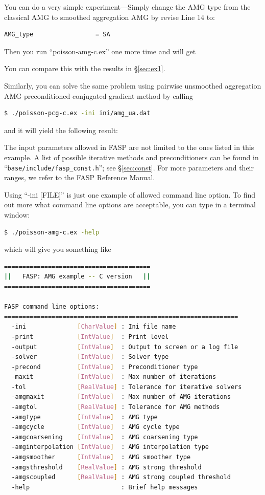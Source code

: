 \documentclass[11pt]{memoir}
\begin{document}
You can do a very simple experiment---Simply change the AMG type from the classical AMG to smoothed aggregation AMG by revise Line 14 to:
%
\begin{lstlisting}[numbers=none]
AMG_type                 = SA
\end{lstlisting}
%
Then you run ``poisson-amg-c.ex'' one more time and will get
%

%
You can compare this with the results in \S\ref{sec:ex1}.

Similarly, you can solve the same problem using pairwise unsmoothed aggregation AMG preconditioned conjugated gradient method by calling
%
\begin{lstlisting}[numbers=none,language=sh]
$ ./poisson-pcg-c.ex -ini ini/amg_ua.dat
\end{lstlisting}
%
and it will yield the following result:
%

%

\begin{snugshade}\noindent  
The input parameters allowed in FASP are not limited to the ones listed in this example. A list of possible iterative methods and preconditioners can be found in ``\verb|base/include/fasp_const.h|''; see \S\ref{sec:const}. For more parameters and their ranges, we refer to the FASP Reference Manual.
\end{snugshade}

Using ``-ini [FILE]'' is just one example of allowed command line option. To find out more what command line options are acceptable, you can type in a terminal window:
%
\begin{lstlisting}[numbers=none,language=sh]
$ ./poisson-amg-c.ex -help
\end{lstlisting}
%
which will give you something like
%
\begin{lstlisting}[numbers=none,language=sh]
========================================
||   FASP: AMG example -- C version   ||
========================================

FASP command line options:
================================================================
  -ini              [CharValue] : Ini file name
  -print            [IntValue]  : Print level
  -output           [IntValue]  : Output to screen or a log file
  -solver           [IntValue]  : Solver type
  -precond          [IntValue]  : Preconditioner type
  -maxit            [IntValue]  : Max number of iterations
  -tol              [RealValue] : Tolerance for iterative solvers
  -amgmaxit         [IntValue]  : Max number of AMG iterations
  -amgtol           [RealValue] : Tolerance for AMG methods
  -amgtype          [IntValue]  : AMG type
  -amgcycle         [IntValue]  : AMG cycle type
  -amgcoarsening    [IntValue]  : AMG coarsening type
  -amginterpolation [IntValue]  : AMG interpolation type
  -amgsmoother      [IntValue]  : AMG smoother type
  -amgsthreshold    [RealValue] : AMG strong threshold
  -amgscoupled      [RealValue] : AMG strong coupled threshold
  -help                         : Brief help messages
 \end{lstlisting}
%
\end{document}
